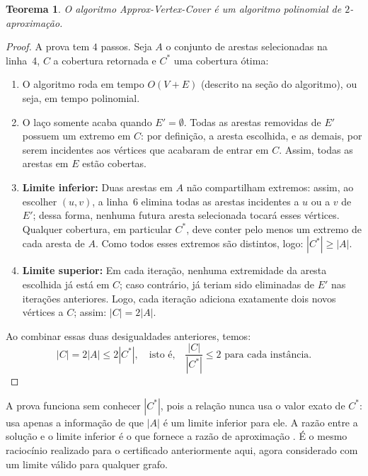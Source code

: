 \newtheorem{theorem}{Teorema}
\newtheorem{proof}{Demonstração}

\begin{theorem}\label{thm:approx-vc}
O algoritmo {Approx-Vertex-Cover} é um algoritmo polinomial de $2$-aproximação.
\end{theorem}

\begin{proof}
A prova tem $4$ passos. Seja $A$ o conjunto de arestas selecionadas na linha~4, $C$ a cobertura retornada e $C^*$ uma cobertura ótima:
\begin{enumerate}
    \item O algoritmo roda em tempo $O(V + E)$ (descrito na seção do algoritmo), ou seja, em tempo polinomial.
    \item O laço somente acaba quando $E' = \emptyset$. Todas as arestas removidas de $E'$ possuem um extremo em $C$: por definição, a aresta escolhida, e as demais, por serem incidentes aos vértices que acabaram de entrar em $C$. Assim, todas as arestas em $E$ estão cobertas.
    \item \textbf{Limite inferior:} Duas arestas em $A$ não compartilham extremos: assim, ao escolher $(u,v)$, a linha~6 elimina todas as arestas incidentes a $u$ ou a $v$ de $E'$; dessa forma, nenhuma futura aresta selecionada tocará esses vértices. Qualquer cobertura, em particular $C^*$, deve conter pelo menos um extremo de cada aresta de $A$. Como todos esses extremos são distintos, logo: $|C^*| \ge |A|$.
    \item \textbf{Limite superior:} Em cada iteração, nenhuma extremidade da aresta escolhida já está em $C$; caso contrário, já teriam sido eliminadas de $E'$ nas iterações anteriores. Logo, cada iteração adiciona exatamente dois novos vértices a $C$; assim: $|C| = 2|A|$.
\end{enumerate}

Ao combinar essas duas desigualdades anteriores, temos:
\begin{equation}\label{eq:garantia-vc}
  |C| = 2|A| \le 2|C^*|, \quad \text{isto é,} \quad \frac{|C|}{|C^*|} \le 2 \text{ para cada instância.}
\end{equation}
\end{proof}

A prova funciona sem conhecer $|C^*|$, pois a relação nunca usa o valor exato de $C^*$: usa apenas a informação de que $|A|$ é um limite inferior para ele. A razão entre a solução e o limite inferior é o que fornece a razão de aproximação \cite[Seção~35.1]{cormen2012}. É o mesmo raciocínio realizado para o certificado anteriormente aqui, agora considerado com um limite válido para qualquer grafo.

